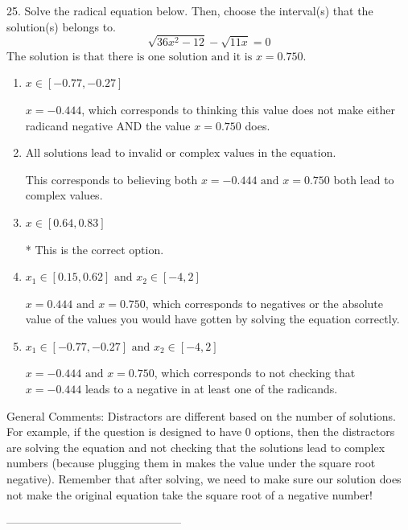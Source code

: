 \documentclass{extbook}[14pt]
\begin{document}
25. Solve the radical equation below. Then, choose the interval(s) that the solution(s) belongs to.
\[ \sqrt{36 x^2 - 12} - \sqrt{11 x} = 0 \] 
The solution is $ \text{that there is one solution and it is } x = 0.750. $ 

\begin{enumerate}[label=\Alph*.] 
\item $ x \in [-0.77,-0.27] $ 

 $x = -0.444$, which corresponds to thinking this value does not make either radicand negative AND the value $x = 0.750$ does. 
\item $ \text{All solutions lead to invalid or complex values in the equation.} $ 

 This corresponds to believing both $x = -0.444 \text{ and } x = 0.750$ both lead to complex values. 
\item $ x \in [0.64,0.83] $ 

 * This is the correct option. 
\item $ x_1 \in [0.15, 0.62] \text{ and } x_2 \in [-4,2] $ 

 $x = 0.444 \text{ and } x = 0.750$, which corresponds to negatives or the absolute value of the values you would have gotten by solving the equation correctly. 
\item $ x_1 \in [-0.77, -0.27] \text{ and } x_2 \in [-4,2] $ 

 $x = -0.444 \text{ and } x = 0.750$, which corresponds to not checking that $x = -0.444$ leads to a negative in at least one of the radicands. 
\end{enumerate} 
 
General Comments: Distractors are different based on the number of solutions. For example, if the question is designed to have 0 options, then the distractors are solving the equation and not checking that the solutions lead to complex numbers (because plugging them in makes the value under the square root negative). Remember that after solving, we need to make sure our solution does not make the original equation take the square root of a negative number!

-----------------------------------------------
\end{document}
